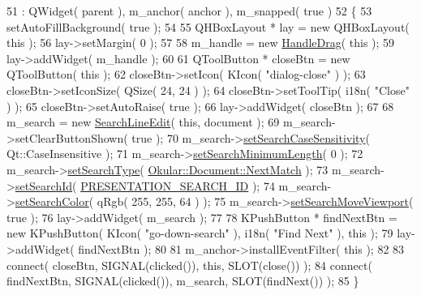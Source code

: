\begin{DoxyCode}
51     : QWidget( parent ), m\_anchor( anchor ), m\_snapped( \textcolor{keyword}{true} )
52 \{
53     setAutoFillBackground( \textcolor{keyword}{true} );
54 
55     QHBoxLayout * lay = \textcolor{keyword}{new} QHBoxLayout( \textcolor{keyword}{this} );
56     lay->setMargin( 0 );
57 
58     m\_handle = \textcolor{keyword}{new} \hyperlink{classHandleDrag}{HandleDrag}( \textcolor{keyword}{this} );
59     lay->addWidget( m\_handle );
60 
61     QToolButton * closeBtn = \textcolor{keyword}{new} QToolButton( \textcolor{keyword}{this} );
62     closeBtn->setIcon( KIcon( \textcolor{stringliteral}{"dialog-close"} ) );
63     closeBtn->setIconSize( QSize( 24, 24 ) );
64     closeBtn->setToolTip( i18n( \textcolor{stringliteral}{"Close"} ) );
65     closeBtn->setAutoRaise( \textcolor{keyword}{true} );
66     lay->addWidget( closeBtn );
67 
68     m\_search = \textcolor{keyword}{new} \hyperlink{classSearchLineEdit}{SearchLineEdit}( \textcolor{keyword}{this}, document );
69     m\_search->setClearButtonShown( \textcolor{keyword}{true} );
70     m\_search->\hyperlink{classSearchLineEdit_a81cd95f5a0bf612d83f4ead3999d926b}{setSearchCaseSensitivity}( Qt::CaseInsensitive );
71     m\_search->\hyperlink{classSearchLineEdit_a2743adac78c82e7651e68807e88b3cbf}{setSearchMinimumLength}( 0 );
72     m\_search->\hyperlink{classSearchLineEdit_a8dc6fe77273e78adf9c95c641ef1de2b}{setSearchType}( \hyperlink{classOkular_1_1Document_af4b4b32563d6013d6da10be1667a7badab071628bda8b6bfb432ceae4eaca8792}{Okular::Document::NextMatch} );
73     m\_search->\hyperlink{classSearchLineEdit_a00ff87a591108a7a3cad4c29b062e9d2}{setSearchId}( \hyperlink{core_2document_8h_acd6eb601c5a13e8378441bedbfc608c2}{PRESENTATION\_SEARCH\_ID} );
74     m\_search->\hyperlink{classSearchLineEdit_ae3ebd6c29d91280797bed839c92b8c82}{setSearchColor}( qRgb( 255, 255, 64 ) );
75     m\_search->\hyperlink{classSearchLineEdit_a0e5c287135a1105de58f39d413621b8e}{setSearchMoveViewport}( \textcolor{keyword}{true} );
76     lay->addWidget( m\_search );
77 
78     KPushButton * findNextBtn = \textcolor{keyword}{new} KPushButton( KIcon( \textcolor{stringliteral}{"go-down-search"} ), i18n( \textcolor{stringliteral}{"Find Next"} ), \textcolor{keyword}{this} );
79     lay->addWidget( findNextBtn );
80 
81     m\_anchor->installEventFilter( \textcolor{keyword}{this} );
82 
83     connect( closeBtn, SIGNAL(clicked()), \textcolor{keyword}{this}, SLOT(close()) );
84     connect( findNextBtn, SIGNAL(clicked()), m\_search, SLOT(findNext()) );
85 \}
\end{DoxyCode}
